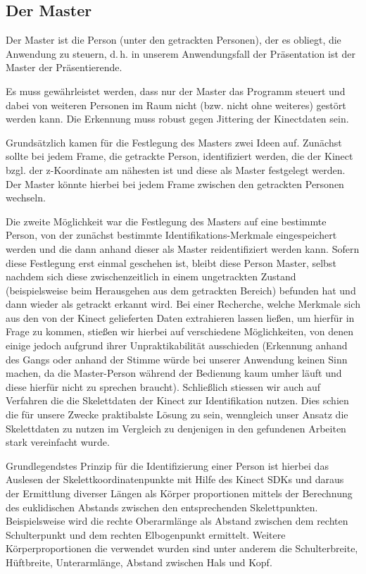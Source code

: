 \subsection{Der Master}
	Der Master ist die Person (unter den getrackten Personen), der es obliegt, die Anwendung zu steuern, d.\,h. in unserem Anwendungsfall der Präsentation ist der Master der Präsentierende.\par
	Es muss gewährleistet werden, dass nur der Master das Programm steuert und dabei von weiteren Personen im Raum nicht (bzw. nicht ohne weiteres) gestört werden kann. Die Erkennung muss robust gegen Jittering der Kinectdaten sein.\par
	Grundsätzlich kamen für die Festlegung des Masters zwei Ideen auf. Zunächst sollte bei jedem Frame, die getrackte Person, identifiziert werden, die der Kinect bzgl. der z-Koordinate am nähesten ist und diese als Master festgelegt werden. Der Master könnte hierbei bei jedem Frame zwischen den getrackten Personen wechseln. \par
	Die zweite Möglichkeit war die Festlegung des Masters auf eine bestimmte Person, von der zunächst bestimmte Identifikations-Merkmale eingespeichert werden und die dann anhand dieser als Master reidentifiziert werden kann. Sofern diese Festlegung erst einmal geschehen ist, bleibt diese Person Master, selbst nachdem sich diese zwischenzeitlich in einem ungetrackten Zustand (beispielsweise beim Herausgehen aus dem getrackten Bereich) befunden hat und dann wieder als getrackt erkannt wird. Bei einer Recherche, welche Merkmale sich aus den von der Kinect gelieferten Daten extrahieren lassen ließen, um hierfür in Frage zu kommen, stießen wir hierbei auf verschiedene Möglichkeiten, von denen einige jedoch aufgrund ihrer Unpraktikabilität ausschieden (Erkennung anhand des Gangs oder anhand der Stimme würde bei unserer Anwendung keinen Sinn machen, da die Master-Person während der Bedienung kaum umher läuft und diese hierfür nicht zu sprechen braucht). Schließlich stiessen wir auch auf Verfahren die die Skelettdaten der Kinect zur Identifikation nutzen. Dies schien die für unsere Zwecke praktibalste Lösung zu sein, wenngleich unser Ansatz die Skelettdaten zu nutzen im Vergleich zu denjenigen in den gefundenen Arbeiten stark vereinfacht wurde.\par
	Grundlegendstes Prinzip für die Identifizierung einer Person ist hierbei das Auslesen der Skelettkoordinatenpunkte mit Hilfe des Kinect SDKs und daraus der Ermittlung diverser Längen als Körper proportionen mittels der Berechnung des euklidischen Abstands zwischen den entsprechenden Skelettpunkten. Beispielsweise wird die rechte Oberarmlänge als Abstand zwischen dem rechten Schulterpunkt und dem rechten Elbogenpunkt ermittelt. Weitere Körperproportionen die verwendet wurden sind unter anderem die Schulterbreite, Hüftbreite, Unterarmlänge, Abstand zwischen Hals und Kopf.
	
